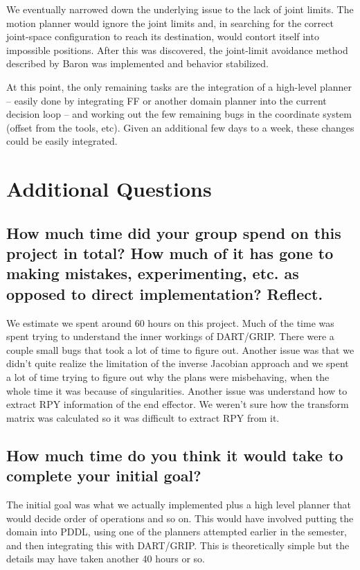 \documentclass[10pt, conference]{IEEEtran}
\begin{document}
   We eventually narrowed down the underlying issue to the lack of joint
   limits. The motion planner would ignore the joint limits and, in
   searching for the correct joint-space configuration to reach its
   destination, would contort itself into impossible positions. After
   this was discovered, the joint-limit avoidance method described by
   Baron \cite{luc_baron} was implemented and behavior stabilized.

   At this point, the only remaining tasks are the integration of a
   high-level planner -- easily done by integrating FF or another domain
   planner into the current decision loop -- and working out the few
   remaining bugs in the coordinate system (offset from the tools,
   etc). Given an additional few days to a week, these changes could be
   easily integrated.




\clearpage
\newpage
\appendix
\section{Additional Questions}
\label{sec-7}
\subsection{How much time did your group spend on this project in total? How much of it has gone to making mistakes, experimenting, etc. as opposed to direct implementation? Reflect.}
\label{sec-7-1}

   We estimate we spent around 60 hours on this project. Much of the
   time was spent trying to understand the inner workings of
   DART/GRIP. There were a couple small bugs that took a lot of time to
   figure out. Another issue was that we didn’t quite realize the
   limitation of the inverse Jacobian approach and we spent a lot of
   time trying to figure out why the plans were misbehaving, when the
   whole time it was because of singularities. Another issue was
   understand how to extract RPY information of the end effector. We
   weren’t sure how the transform matrix was calculated so it was
   difficult to extract RPY from it.
\subsection{How much time do you think it would take to complete your initial goal?}
\label{sec-7-2}

   The initial goal was what we actually implemented plus a high level
   planner that would decide order of operations and so on. This would
   have involved putting the domain into PDDL, using one of the planners
   attempted earlier in the semester, and then integrating this with
   DART/GRIP. This is theoretically simple but the details may have
   taken another 40 hours or so.
\end{document}
